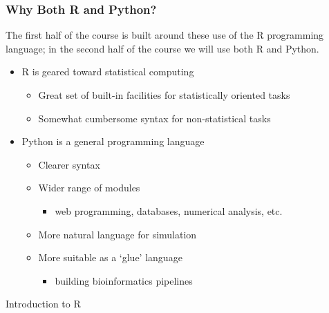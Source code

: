 \documentclass{beamer}
\begin{document}
\begin{frame}
  \frametitle{Why Both R and Python?}

The first half of the course is built around these use of the R programming language; in the second half of the course we will use both R and Python.

\begin{itemize}

\item R is geared toward statistical computing
\begin{itemize}
	\item Great set of built-in facilities for statistically oriented tasks
	\item Somewhat cumbersome syntax for non-statistical tasks
\end{itemize}

\item Python is a general programming language
\begin{itemize}
	\item Clearer syntax
 \item Wider range of modules
		\begin{itemize}
			\item web programming, databases, numerical analysis, etc.
		\end{itemize}
	\item More natural language for simulation
	\item More suitable as a `glue' language
		\begin{itemize}
			\item building bioinformatics pipelines
		\end{itemize}
\end{itemize}

\end{itemize}

\end{frame}


\begin{frame}

\begin{center}
\LARGE{Introduction to R}
\end{center}

\end{frame}
\end{document}
